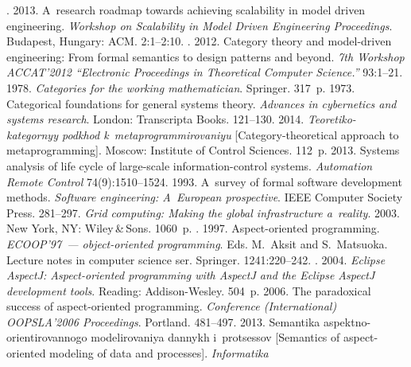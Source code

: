 \begin{multicols}{2}
{{\begin{thebibliography}{99}
. 2013. 
A~research roadmap towards achieving scalability in model driven engineering. \textit{Workshop 
on Scalability in Model Driven Engineering Proceedings}. Budapest, Hungary: ACM.  2:1--2:10.
. 2012. Category theory and model-driven engineering: 
From formal semantics to design patterns and beyond. \textit{7th Workshop ACCAT'2012 
``Electronic Proceedings in Theoretical Computer Science.''} 93:1--21.
 1978. \textit{Categories for the working mathematician}. Springer. 317~p.
 1973. Categorical foundations for general systems theory. \textit{Advances in 
cybernetics and systems research}. London: Transcripta Books. 121--130.
 2014.  \textit{Teoretiko-kategornyy podkhod k~metaprogrammirovaniyu} 
[Category-theoretical approach to metaprogramming]. Moscow: Institute of Control Sciences. 
112~p.
 2013. Systems analysis of life cycle of large-scale information-control 
systems. \textit{Automation Remote Control} 74(9):1510--1524.
 1993. A~survey of formal software development methods. \textit{Software 
engineering: A~European prospective}. IEEE Computer Society Press.  281--297.
\textit{Grid computing: Making the global infrastructure a~reality}. 2003. New York, NY: 
Wiley\,\&\,Sons. 1060~p.
. 1997. Aspect-oriented programming. 
\textit{ECOOP'97~--- object-oriented programming}.
Eds. M.~Aksit and S.~Matsuoka. Lecture notes in computer science ser.
Springer. 1241:220--242.
. 2004. \textit{Eclipse AspectJ:  
Aspect-oriented programming with \mbox{AspectJ} and the Eclipse AspectJ development tools}. Reading: 
Addison-Wesley. 504~p.
 2006. The paradoxical success of aspect-oriented programming. 
\textit{Conference (International)  \mbox{OOPSLA'2006} Proceedings}. Portland.  481--497.
 2013.  Semantika aspektno-orientirovannogo modelirovaniya dannykh 
i~protsessov [Semantics of aspect-oriented modeling of data and processes]. \textit{Informatika 
}
\end{thebibliography}}}
\end{multicols}
